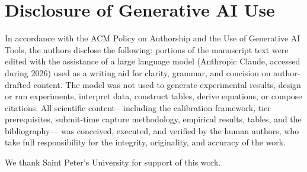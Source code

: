 \documentclass[sigconf]{acmart}
\begin{document}
\section*{Disclosure of Generative AI Use}
In accordance with the ACM Policy on Authorship and the Use of Generative
AI Tools, the authors disclose the following: portions of the manuscript
text were edited with the assistance of a large language model (Anthropic
Claude, accessed during 2026) used as a writing aid for clarity, grammar,
and concision on author-drafted content. The model was not used to
generate experimental results, design or run experiments, interpret data,
construct tables, derive equations, or compose citations. All scientific
content---including the calibration framework, tier prerequisites,
submit-time capture methodology, empirical results, tables, and the bibliography---
was conceived, executed, and verified by the human authors, who take full
responsibility for the integrity, originality, and accuracy of the work.

\begin{acks}
We thank Saint Peter's University for support of this work.
\end{acks}



\end{document}
